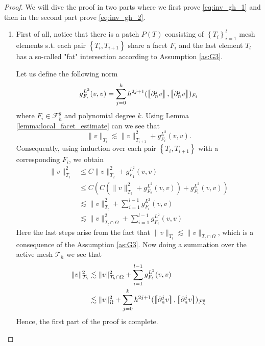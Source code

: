 \begin{proof}
    We will dive the proof in two parts where we first prove \eqref{eq:inv_gh_1} and then in the second part prove \eqref{eq:inv_gh_2}.
    \begin{enumerate}[label=\arabic*)]
        \item
            First of all, notice that there is a patch $P(T) $ consisting of $\left\{ T_{i} \right\}_{i=1}^{l} $ mesh elements s.t. each pair $ \left\{ T_{i}, T_{i+1} \right\} $ share a facet $F_{i}$ and the last element $T_{l}$ has a so-called "fat"
            intersection according to Assumption \ref{as:G3}.

            Let us define the following norm \[
            g_{F_{i}}^{L^{2}}( v,v)  = \sum_{j=0}^{k} h^{2j+1}( \jump{ \partial ^{j}_{n}v }, \jump{ \partial ^{j}_{n}v }    )_{F_{i} }
            \]
            where $F_{i} \in  \mathcal{F} ^{g}_{h}$ and polynomial degree $ k$. Using Lemma \ref{lemma:local_facet_estimate} can we see that \[
            \| v \|_{ T_{i} }^{  } \lesssim \| v \|_{ T_{i+1} }^{ 2 } + g_{F_{i}}^{L^{2}}( v,v).
            \]
    Consequently, using induction over each pair $\left\{ T_{i}, T_{i+1} \right\} $ with a corresponding $F_{i}$, we obtain
            \[
                \begin{split}
            \| v \|_{ T_{1} }^{2  }  & \le  C \| v \|_{ T_{2} }^{ 2 } + g_{F_{1}}^{L^{2}}( v,v)\\
              & \le  C( C( \| v \|_{ T_{3} }^{ 2 } + g_{F_{2}}^{L^{2}}( v,v) ) + g_{F_{1}}^{L^{2}}( v,v) )\\
              & \lesssim    \| v \|_{ T_{l} }^{ 2 }  + \sum_{i=1}^{l-1} g_{F_{i}}^{L^{2}}( v,v)  \\
              & \lesssim    \| v \|_{ T_{l} \cap \Omega  }^{ 2 }  + \sum_{i=1}^{l-1} g_{F_{i}}^{L^{2}}( v,v)
                \end{split}
            \]
            Here the last steps arise from the fact that $\|  v \|_{ T_{l} }^{  } \lesssim  \|  v \|_{ T_{l} \cap \Omega  }^{  }  $, which is a consequence of the Assumption \ref{as:G3}.
            Now doing a summation over the active mesh $\mathcal{T} _{h}$ we see that
            \[
                \begin{split}
                    \| v \|_{ \mathcal{T} _{h} }^{2  } &\lesssim \| v \|_{ \mathcal{T} _{h}\cap \Omega  }^{2  }+ \sum_{i=1}^{l-1} g_{F_{l}}^{L^{2}}( v,v) \\
                     &\lesssim \| v \|_{ \Omega  }^{ 2 }  + \sum_{j=0}^{k} h^{2j+1} ( \jump{ \partial ^{j}_{n} v }, \jump{ \partial ^{j}_{n}v }    )_{\mathcal{F}_{h}^{g}}
                \end{split}
        \]
        Hence, the first part of the proof is complete.


\end{enumerate}
\end{proof}
